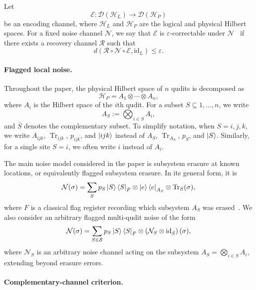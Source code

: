 \documentclass[10pt,twocolumn,superscriptaddress,aps,amsmath,amssymb,citeautoscript,floatfix,prx,longbibliography]{revtex4-2}
\theoremstyle{plain}
\theoremstyle{plain}
\theoremstyle{plain}
\theoremstyle{plain}
\theoremstyle{plain}
\theoremstyle{plain}
\begin{document}
Let
$$
\mathcal E:
\mathcal D(\mathcal H_L)
\to
\mathcal D(\mathcal H_P)
$$
be an encoding channel, where $\mathcal H_L$ and $\mathcal H_P$ are the logical and physical Hilbert spaces. For a fixed noise channel $\mathcal N$, we say that $\mathcal E$ is $\varepsilon$-correctable under $\mathcal N$~\cite{Beny2010} if there exists a recovery channel $\mathcal R$ such that
$$
d(\mathcal R\circ\mathcal N\circ\mathcal E,\mathrm{id}_L)
\le
\varepsilon .
$$

\paragraph{Flagged local noise.}

Throughout the paper, the physical Hilbert space of $n$ qudits is decomposed as
$$
\mathcal H_P
=
A_1\otimes\cdots\otimes A_n,
$$
where $A_i$ is the Hilbert space of the $i$th qudit. For a subset $S\subseteq{1,\ldots,n}$, we write
$$
A_S
:=
\bigotimes_{i\in S}A_i,
$$
and $\bar S$ denotes the complementary subset. To simplify notation, when $S={i,j,k}$, we write $A_{ijk}$, $\operatorname{Tr}_{ijk}$, $p_{ijk}$, and $\ket{ijk}$ instead of $A_S$, $\operatorname{Tr}_{A_S}$, $p_S$, and $\ket S$. Similarly, for a single site $S={i}$, we often write $i$ instead of $A_i$.

The main noise model considered in the paper is subsystem erasure at known locations, or equivalently flagged subsystem erasure. In its general form, it is
\begin{equation}\label{eq:erasure_noise}
\mathcal N(\sigma)
=
\sum_S
p_S
\ket S\bra S_F
\otimes
\ket e\bra e_{A_S}
\otimes
\operatorname{Tr}_S(\sigma),
\end{equation}
where $F$ is a classical flag register recording which subsystem $A_S$ was erased~\cite{Faist2020}. We also consider an arbitrary flagged multi-qudit noise of the form
\begin{equation}\label{eq:arbitrary_multiqudit_noise}
\mathcal N(\sigma)
=
\sum_{S\in\mathcal S}
p_S
\ket S\bra S_F
\otimes
\left(
\mathcal N_S
\otimes
\mathrm{id}_{\bar S}
\right)(\sigma),
\end{equation}
where $\mathcal N_S$ is an arbitrary noise channel acting on the subsystem $A_S=\bigotimes_{i\in S}A_i$, extending beyond erasure errors.

\paragraph{Complementary-channel criterion.}
\end{document}
